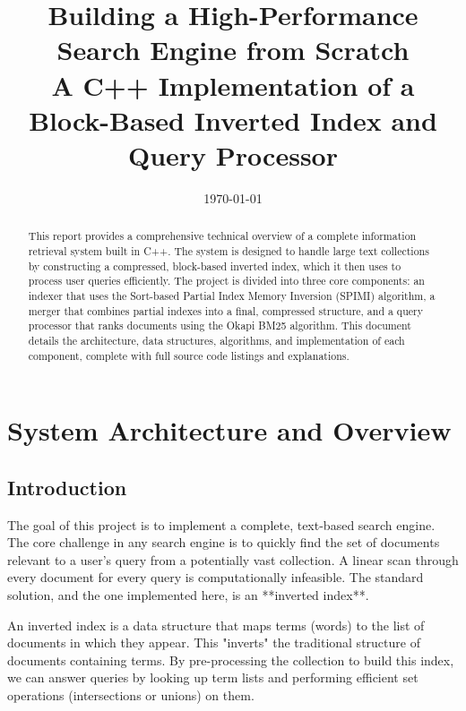 \documentclass[11pt, a4paper]{report}
\title{
    \Huge\bfseries Building a High-Performance Search Engine from Scratch \\
    \large A C++ Implementation of a Block-Based Inverted Index and Query Processor
}
\date{\today}
\begin{document}
\maketitle

\begin{abstract}
    \noindent This report provides a comprehensive technical overview of a complete information retrieval system built in C++. The system is designed to handle large text collections by constructing a compressed, block-based inverted index, which it then uses to process user queries efficiently. The project is divided into three core components: an indexer that uses the Sort-based Partial Index Memory Inversion (SPIMI) algorithm, a merger that combines partial indexes into a final, compressed structure, and a query processor that ranks documents using the Okapi BM25 algorithm. This document details the architecture, data structures, algorithms, and implementation of each component, complete with full source code listings and explanations.
\end{abstract}

\newpage
\tableofcontents
\newpage

\chapter{System Architecture and Overview}

\section{Introduction}
The goal of this project is to implement a complete, text-based search engine. The core challenge in any search engine is to quickly find the set of documents relevant to a user's query from a potentially vast collection. A linear scan through every document for every query is computationally infeasible. The standard solution, and the one implemented here, is an **inverted index**.

An inverted index is a data structure that maps terms (words) to the list of documents in which they appear. This "inverts" the traditional structure of documents containing terms. By pre-processing the collection to build this index, we can answer queries by looking up term lists and performing efficient set operations (intersections or unions) on them.
\end{document}
